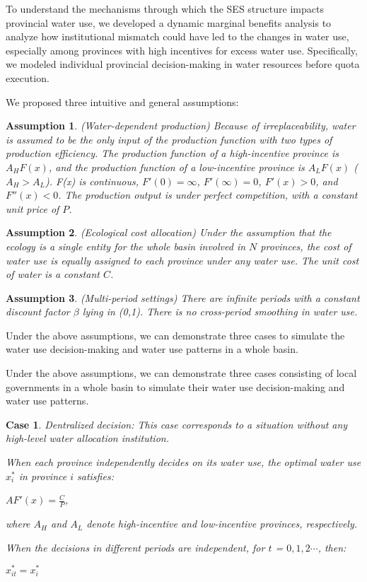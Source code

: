 \documentclass[default, sn-standardnature]{sn-jnl}
\newtheorem{ass}{Assumption}
\newtheorem{case}{Case}
\begin{document}
To understand the mechanisms through which the SES structure impacts provincial water use, we developed a dynamic marginal benefits analysis to analyze how institutional mismatch could have led to the changes in water use, especially among provinces with high incentives for excess water use. Specifically, we modeled individual provincial decision-making in water resources before quota execution.

We proposed three intuitive and general assumptions:

\begin{ass}
(Water-dependent production) Because of irreplaceability, water is assumed to be the only input of the production function with two types of production efficiency. The production function of a high-incentive province is $A_HF(x)$, and the production function of a low-incentive province is $A_LF(x)$ ($A_H>A_L$). F(x) is continuous, $F'(0)=\infty$, $ F'(\infty)=0$, $F'(x)>0$, and $F''(x)<0$. The production output is under perfect competition, with a constant unit price of $P$.
\end{ass}

\begin{ass}
 (Ecological cost allocation) Under the assumption that the ecology is a single entity for the whole basin involved in $N$ provinces, the cost of water use is equally assigned to each province under any water use. The unit cost of water is a constant $C$.
\end{ass}
\begin{ass}
(Multi-period settings) There are infinite periods with a constant discount factor $\beta$ lying in (0,1). There is no cross-period smoothing in water use.
\end{ass}
Under the above assumptions, we can demonstrate three cases to simulate the water use decision-making and water use patterns in a whole basin.

Under the above assumptions, we can demonstrate three cases consisting of local governments in a whole basin to simulate their water use decision-making and water use patterns.

\begin{case}Dentralized decision: This case corresponds to a situation without any high-level water allocation institution.

When each province independently decides on its water use, the optimal water use $x_i^*$ in province $i$ satisfies:

 $AF'(x)=\frac{C}{P}$,

 where $A_H$ and $A_L$ denote high-incentive and low-incentive provinces, respectively.

 When the decisions in different periods are independent, for $t$ = $0, 1, 2 \cdots$, then:

 $x_{it}^* = x_i^*$

 \end{case}
\end{document}
